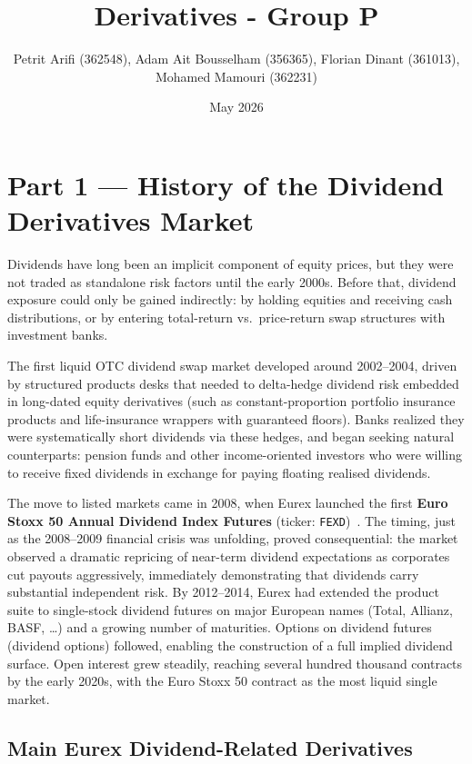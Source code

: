 \documentclass[12pt,a4paper]{article}
\title{Derivatives - Group P}
\author{\parbox{0.9\textwidth}{\centering Petrit Arifi (362548), Adam Ait Bousselham (356365), Florian Dinant (361013), Mohamed Mamouri (362231)}}
\date{May 2026}
\begin{document}
\maketitle

\section*{Part 1 --- History of the Dividend Derivatives Market}
 
Dividends have long been an implicit component of equity prices, but they were not
traded as standalone risk factors until the early 2000s.
Before that, dividend exposure could only be gained indirectly: by holding equities and
receiving cash distributions, or by entering total-return vs.\ price-return swap
structures with investment banks.
 
The first liquid OTC dividend swap market developed around 2002--2004, driven by
structured products desks that needed to delta-hedge dividend risk embedded in
long-dated equity derivatives (such as constant-proportion portfolio insurance products
and life-insurance wrappers with guaranteed floors).
Banks realized they were systematically short dividends via these hedges, and began
seeking natural counterparts: pension funds and other income-oriented investors who were
willing to receive fixed dividends in exchange for paying floating realised dividends.
 
The move to listed markets came in 2008, when Eurex launched the first
\textbf{Euro Stoxx 50 Annual Dividend Index Futures} (ticker: \texttt{FEXD})~\cite{eurex}.
The timing, just as the 2008--2009 financial crisis was unfolding, proved consequential:
the market observed a dramatic repricing of near-term dividend expectations as corporates
cut payouts aggressively, immediately demonstrating that dividends carry substantial
independent risk.
By 2012--2014, Eurex had extended the product suite to single-stock dividend futures
on major European names (Total, Allianz, BASF, \ldots) and a growing number of maturities.
Options on dividend futures (dividend options) followed, enabling the construction of a
full implied dividend surface.
Open interest grew steadily, reaching several hundred thousand contracts by the early
2020s, with the Euro Stoxx 50 contract as the most liquid single market.
 
\subsection*{Main Eurex Dividend-Related Derivatives}
 
\end{document}
